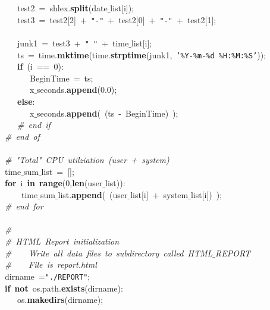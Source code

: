 \mbox{}\ \ \ \ \ \ test2\ =\ shlex.\textbf{split}(date$\_$list[i]); \\
\mbox{}\ \ \ \ \ \ test3\ =\ test2[2]\ +\ \texttt{"{}-"{}}\ +\ test2[0]\ +\ \texttt{"{}-"{}}\ +\ test2[1]; \\
\mbox{}\ \ \ \ \ \  \\
\mbox{}\ \ \ \ \ \ junk1\ =\ test3\ +\ \texttt{"{}\ "{}}\ +\ time$\_$list[i]; \\
\mbox{}\ \ \ \ \ \ ts\ =\ time.\textbf{mktime}(time.\textbf{strptime}(junk1,\ \texttt{'\%Y-\%m-\%d\ \%H:\%M:\%S'})); \\
\mbox{}\ \ \ \ \ \ \textbf{if}\ (i\ ==\ 0): \\
\mbox{}\ \ \ \ \ \ \ \ \ BeginTime\ =\ ts; \\
\mbox{}\ \ \ \ \ \ \ \ \ x$\_$seconds.\textbf{append}(0.0); \\
\mbox{}\ \ \ \ \ \ \textbf{else}: \\
\mbox{}\ \ \ \ \ \ \ \ \ x$\_$seconds.\textbf{append}(\ (ts\ -\ BeginTime)\ ); \\
\mbox{}\ \ \ \ \ \ \textit{\#\ end\ if} \\
\mbox{}\ \ \ \textit{\#\ end\ of} \\
\mbox{}\ \ \  \\
\mbox{}\ \ \ \textit{\#\ "{}Total"{}\ CPU\ utilziation\ (user\ +\ system)} \\
\mbox{}\ \ \ time$\_$sum$\_$list\ =\ []; \\
\mbox{}\ \ \ \textbf{for}\ i\ \textbf{in}\ \textbf{range}(0,\textbf{len}(user$\_$list)): \\
\mbox{}\ \ \ \ \ \ \ time$\_$sum$\_$list.\textbf{append}(\ (user$\_$list[i]\ +\ system$\_$list[i])\ ); \\
\mbox{}\ \ \ \textit{\#\ end\ for} \\
\mbox{}\ \ \  \\
\mbox{}\ \ \ \textit{\#\ } \\
\mbox{}\ \ \ \textit{\#\ HTML\ Report\ initialization} \\
\mbox{}\ \ \ \textit{\#\ \ \ \ Write\ all\ data\ files\ to\ subdirectory\ called\ HTML$\_$REPORT} \\
\mbox{}\ \ \ \textit{\#\ \ \ \ File\ is\ report.html} \\
\mbox{}\ \ \ dirname\ =\texttt{"{}./REPORT"{}}; \\
\mbox{}\ \ \ \textbf{if}\ \textbf{not}\ os.path.\textbf{exists}(dirname): \\
\mbox{}\ \ \ \ \ \ os.\textbf{makedirs}(dirname); \\
